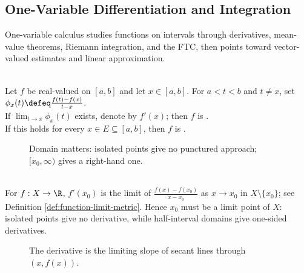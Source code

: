 \subsection{One-Variable Differentiation and Integration}

%

One-variable calculus studies functions on intervals through derivatives, mean-value theorems, Riemann integration, and the FTC, then points toward vector-valued estimates and linear approximation.

\begin{definition} \label{def:derivative-real-function}\label{def:one-variable-differentiation-core-source-todo} \\
Let $f$ be real-valued on $[a,b]$ and let $x\in[a,b]$. For $a<t<b$ and $t\neq x$, set $\phi_x(t)\defeq\frac{f(t)-f(x)}{t-x}$.\\
If $\lim_{t\to x}\phi_x(t)$ exists, denote  by $f'(x)$; then $f$ is .\\
If this holds for every $x\in E\subseteq[a,b]$, then $f$ is .
\end{definition}

\begin{figure}[H]
  \centering
  
  \caption{Domain matters: isolated points give no punctured approach; $[x_0,\infty)$ gives a right-hand one.}
  \label{fig:one-variable-domain-restriction}
\end{figure}

\begin{perspective} \label{per:one-variable-domain-of-differentiability} \\
For $f:X\to\R$, $f'(x_0)$ is the limit of $\frac{f(x)-f(x_0)}{x-x_0}$ as $x\to x_0$ in $X\setminus\{x_0\}$; see Definition \ref{def:function-limit-metric}. Hence $x_0$ must be a limit point of $X$: isolated points give no derivative, while half-interval domains give one-sided derivatives.
\end{perspective}

\begin{figure}[H]
  \centering
  
  \caption{The derivative is the limiting slope of secant lines through $(x,f(x))$.}
  \label{fig:derivative-secant-to-tangent}
\end{figure}

